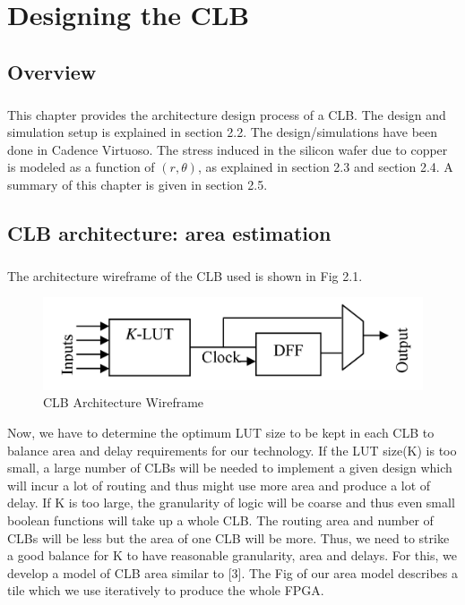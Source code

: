 %
%
\let\textcircled=\pgftextcircled
\chapter{Designing the CLB}
\label{chap:CLB_design}

\section{Overview}
\paragraph{}

This chapter provides the architecture design process of a CLB. The design and simulation setup is explained in section 2.2. The design/simulations have been done in Cadence Virtuoso. The stress induced in the silicon wafer due to copper is modeled as a function of $(r, \theta)$, as explained in section 2.3 and section 2.4. A summary of this chapter is given in section 2.5.

\section{CLB architecture: area estimation}
\paragraph{}
The architecture wireframe of the CLB used is shown in Fig 2.1.
\begin{figure}[H]
\centering
\includegraphics[width=0.7\linewidth]{CLB_wireframe.png}
\caption{CLB Architecture Wireframe}
\label{fig:Figure}
\end{figure}
 Now, we have to determine the optimum LUT size to be kept in each CLB to balance area and delay requirements for our technology. If the LUT size(K) is too small, a large number of CLBs will be needed to implement a given design which will incur a lot of routing and thus might use more area and produce a lot of delay. If K is too large, the granularity of logic will be coarse and thus even small boolean functions will take up a whole CLB. The routing area and number of CLBs will be less but the area of one CLB will be more. Thus, we need to strike a good balance for K to have reasonable granularity, area and delays. For this, we develop a model of CLB area similar to [3]. The Fig of our area model describes a tile which we use iteratively to produce the whole FPGA.

